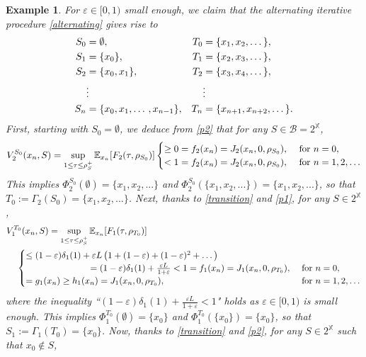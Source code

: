 \documentclass[11pt,reqno]{article}
\numberwithin{equation}{section}
\newtheorem{example}{Example}[section]
\newcommand{\E}{\mathbb{E}}
\newcommand{\X}{\mathbb{X}}
\newcommand{\B}{\mathcal{B}}
\newcommand{\eps}{\varepsilon}
\begin{document}
\begin{example}
For $\eps\in[0,1)$ small enough, we claim that the alternating iterative procedure \eqref{alternating} gives rise to 
\begin{align}
S_0&=\emptyset, &T_0&=\{x_1,x_2,\dotso\},\notag\\
S_1&=\{x_0\}, &T_1&=\{x_2,x_3,\dotso\},\notag\\
S_2&=\{x_0,x_1\}, &T_2&=\{x_3,x_4,\dotso\},\label{eg1 S_n T_n}\\
&\vdots& &\vdots\notag\\
S_n&=\{x_0,x_1,\dotso,x_{n-1}\},&T_n&=\{x_{n+1},x_{n+2},\dotso\}.\notag
\end{align}
First, starting with $S_0=\emptyset$, we deduce from \eqref{p2} that for any $S\in \B=2^\X$, 
\begin{equation}\label{1in}
V^{S_0}_2(x_n,S) = \sup_{1\le \tau\le \rho^+_S} \E_{x_n}[F_2(\tau,\rho_{S_0})]
\begin{cases}
\ge 0 =f_2(x_n)=J_2(x_n,0,\rho_{S_0}),\  &\hbox{for}\ n=0,\\
<1 =f_2(x_n)=J_2(x_n,0,\rho_{S_0}),\  &\hbox{for}\ n=1,2,\dotso
\end{cases}
\end{equation}
This implies $\Phi^{S_0}_2(\emptyset) = \{x_1,x_2,...\}$ and $\Phi^{S_0}_2(\{x_1,x_2,...\}) = \{x_1,x_2,...\}$, so that $T_0 := \Gamma_2(S_0)=\{x_1,x_2,...\}$. Next, thanks to \eqref{transition} and \eqref{p1}, for any $S\in 2^\X$, 
\begin{align}
V^{T_0}_1(x_n,S)& = \sup_{1\le \tau\le \rho^+_S} \E_{x_n}[F_1(\tau,\rho_{T_0})]\notag\\
&\hspace{-0.5in}\begin{cases}
\le (1-\eps)\delta_1(1)+\eps L \left(1+(1-\eps)+(1-\eps)^2+\dotso\right)\\
\hspace{1in}= (1-\eps)\delta_1(1)+\frac{\eps L}{1+\eps} <1 =f_1(x_n)= J_1(x_n,0,\rho_{T_0}),\ &\hbox{for}\ n=0,\label{2in}\\
=g_1(x_n)\ge h_1(x_n) = J_1(x_n,0,\rho_{T_0}),\ &\hbox{for}\ n=1,2,\dotso
\end{cases}
\end{align}
where the inequality ``$(1-\eps)\delta_1(1)+\frac{\eps L}{1+\eps} <1$"  holds as $\eps\in [0,1)$ is small enough. This implies $\Phi^{T_0}_1(\emptyset) = \{x_0\}$ and $\Phi^{T_0}_1(\{x_0\}) = \{x_0\}$, so that $S_1 := \Gamma_1(T_0)=\{x_0\}$. Now, thanks to \eqref{transition} and \eqref{p2}, for any $S\in 2^\X$ such that $x_0\notin S$, 
\begin{align}

\end{align}
\end{example}
\end{document}
